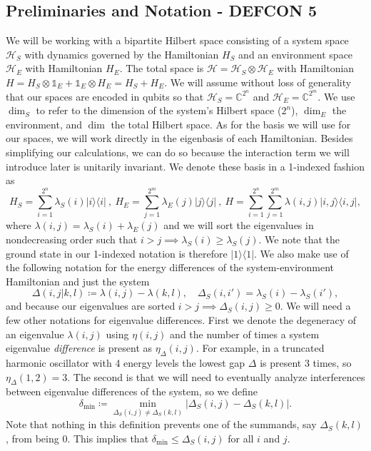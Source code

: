 \documentclass{article}
\newcommand{\ketbra}[2]{| #1\rangle\! \langle #2|}
\newcommand{\hilb}{\mathcal{H}}
\newcommand{\identity}{\mathds{1}}
\begin{document}
\subsection{Preliminaries and Notation - DEFCON 5} \label{sec:prelim}
We will be working with a bipartite Hilbert space consisting of a system space $\hilb_S$ with dynamics governed by the Hamiltonian $H_S$ and an environment space $\hilb_E$ with Hamiltonian $H_E$. The total space is $\hilb = \hilb_S \otimes \hilb_E$ with Hamiltonian $H = H_S \otimes \identity_E + \identity_E \otimes H_E = H_S + H_E$. We will assume without loss of generality that our spaces are encoded in qubits so that $\hilb_S = \mathbb{C}^{2^n}$ and $\hilb_E = \mathbb{C}^{2^m}$. We use $\dim_S$ to refer to the dimension of the system's Hilbert space ($2^n$), $\dim_E$ the environment, and $\dim$ the total Hilbert space. As for the basis we will use for our spaces, we will work directly in the eigenbasis of each Hamiltonian. Besides simplifying our calculations, we can do so because the interaction term we will introduce later is unitarily invariant. We denote these basis in a 1-indexed fashion as
\begin{equation}
    H_{S} = \sum_{i = 1}^{2^n} \lambda_S(i) \ketbra{i}{i} ~,~ H_{E} = \sum_{j=1}^{2^m } \lambda_E(j) \ketbra{j}{j} ~,~ H = \sum_{i=1}^{2^n } \sum_{j=1}^{2^m } \lambda(i,j) \ketbra{i,j}{i,j},
\end{equation}
where $\lambda(i,j) = \lambda_S(i) + \lambda_E(j)$ and we will sort the eigenvalues in nondecreasing order such that $i > j \implies \lambda_S(i) \geq \lambda_S(j)$. We note that the ground state in our 1-indexed notation is therefore $\ketbra{1}{1}$. We also make use of the following notation for the energy differences of the system-environment Hamiltonian and just the system
\begin{equation}
\Delta(i,j|k,l) \coloneqq \lambda(i,j) - \lambda(k,l), \quad \Delta_S(i,i') = \lambda_S(i) - \lambda_S(i'), \label{eq:delta_def}
\end{equation}
and because our eigenvalues are sorted $i > j \implies \Delta_S(i,j) \geq 0$. We will need a few other notations for eigenvalue differences. First we denote the degeneracy of an eigenvalue $\lambda(i,j)$ using $\eta(i,j)$ and the number of times a system eigenvalue \emph{difference} is present as $\eta_\Delta(i,j)$. For example, in a truncated harmonic oscillator with 4 energy levels the lowest gap $\Delta$ is present 3 times, so $\eta_\Delta(1, 2) = 3$. The second is that we will need to eventually analyze interferences between eigenvalue differences of the system, so we define
\begin{equation}
    \delta_{\min} \coloneqq \min_{\Delta_S(i,j) \neq \Delta_S(k,l)} \left| \Delta_S(i,j) - \Delta_S(k, l) \right|. \label{eq:delta_min_def}
\end{equation}
Note that nothing in this definition prevents one of the summands, say $\Delta_S(k,l)$, from being 0. This implies that $\delta_{\min} \leq \Delta_S(i,j)$ for all $i$ and $j$.
\end{document}
